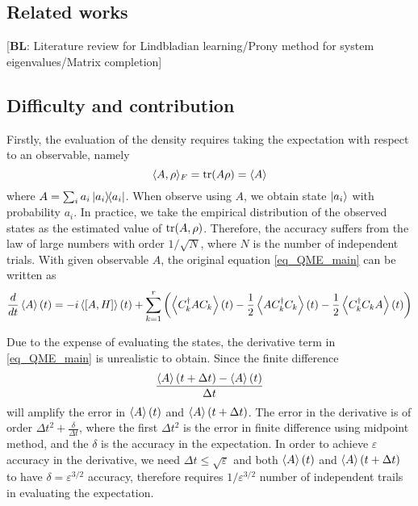 \documentclass[10pt]{article}  %
\theoremstyle{plain}
\numberwithin{equation}{section}
\newcommand{\innerp}[1]{\langle{#1}\rangle}
\newcommand{\bl}[1]{{\color{magenta} [\textbf{BL}: #1]}}
\begin{document}
\subsection*{Related works} 
\bl{Literature review for Lindbladian learning/Prony method for system eigenvalues/Matrix completion}

\subsection*{Difficulty and contribution} 
Firstly, the evaluation of the density requires taking the expectation with respect to an observable, namely
$$ \innerp{A, \rho}_F = \tr(A \rho) = \expval{A}$$
where $A = \sum_i a_i \ketbra{a_i}{a_i}$. When observe using $A$, we obtain state $\ket{a_i}$ with probability $a_i$. In practice, we take the empirical distribution of the observed states as the estimated value of $\tr(A, \rho)$. Therefore, the accuracy suffers from the law of large numbers with order $1/\sqrt{N}$, where $N$ is the number of independent trials. With given observable $A$, the original equation \eqref{eq_QME_main} can be written as 
\begin{equation}
	\frac{d}{dt} \expval{A}(t) = -i\expval{[A, H]}(t) + \sum_{k = 1}^r \left(\expval{C_k^\dagger A C_k}(t) - \frac{1}{2} \expval{A C_k^\dagger C_k} (t) - \frac{1}{2} \expval{C_k^\dagger C_k A}(t) \right)
\end{equation}

Due to the expense of evaluating the states, the derivative term in \eqref{eq_QME_main} is unrealistic to obtain. Since the finite difference 
$$ \frac{\expval{A}(t + \Delta t) - \expval{A}(t)}{\Delta t} $$ 
will amplify the error in $\expval{A}(t)$ and $\expval{A}(t + \Delta t)$. The error in the derivative is of order $\Delta t^2 + \frac{\delta}{\Delta t}$, where the first $\Delta t^2 $ is the error in finite difference using midpoint method, and the $\delta$ is the accuracy in the expectation. In order to achieve $\varepsilon$ accuracy in the derivative, we need $\Delta t \leq \sqrt{\varepsilon}$ and both $\expval{A}(t)$ and $\expval{A}(t + \Delta t)$ to have $\delta = \varepsilon^{3/2}$ accuracy, therefore requires $1/\varepsilon^{3/2}$ number of independent trails in evaluating the expectation.
\end{document}
